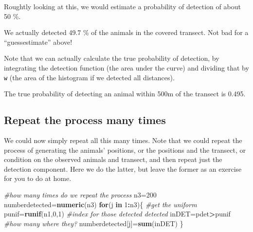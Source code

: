 \documentclass[
]{article}
\newenvironment{Shaded}{\begin{snugshade}}{\end{snugshade}}
\newcommand{\AttributeTok}[1]{\textcolor[rgb]{0.13,0.29,0.53}{#1}}
\newcommand{\CommentTok}[1]{\textcolor[rgb]{0.56,0.35,0.01}{\textit{#1}}}
\newcommand{\ControlFlowTok}[1]{\textcolor[rgb]{0.13,0.29,0.53}{\textbf{#1}}}
\newcommand{\DecValTok}[1]{\textcolor[rgb]{0.00,0.00,0.81}{#1}}
\newcommand{\FunctionTok}[1]{\textcolor[rgb]{0.13,0.29,0.53}{\textbf{#1}}}
\newcommand{\NormalTok}[1]{#1}
\newcommand{\OtherTok}[1]{\textcolor[rgb]{0.56,0.35,0.01}{#1}}
\newcommand{\SpecialCharTok}[1]{\textcolor[rgb]{0.81,0.36,0.00}{\textbf{#1}}}
\begin{document}
Roughtly looking at this, we would estimate a probability of detection
of about 50 \%.

We actually detected 49.7 \% of the animals in the covered transect. Not
bad for a ``guessestimate'' above!

Note that we can actually calculate the true probability of detection,
by integrating the detection function (the area under the curve) and
dividing that by \texttt{w} (the area of the histogram if we detected
all distances).

\begin{Shaded}
\end{Shaded}

The true probability of detecting an animal within 500m of the transect
is 0.495.

\subsection{Repeat the process many
times}\label{repeat-the-process-many-times}

We could now simply repeat all this many times. Note that we could
repeat the process of generating the animals' positions, or the
positions and the transect, or condition on the observed animals and
transect, and then repeat just the detection component. Here we do the
latter, but leave the former as an exercise for you to do at home.

\begin{Shaded}
\begin{Highlighting}[]
\CommentTok{\#how many times do we repeat the process}
\NormalTok{n3}\OtherTok{=}\DecValTok{200}
\NormalTok{numberdetected}\OtherTok{=}\FunctionTok{numeric}\NormalTok{(n3)}
\ControlFlowTok{for}\NormalTok{(j }\ControlFlowTok{in} \DecValTok{1}\SpecialCharTok{:}\NormalTok{n3)\{}
\CommentTok{\#get the uniform}
\NormalTok{punif}\OtherTok{=}\FunctionTok{runif}\NormalTok{(n1,}\DecValTok{0}\NormalTok{,}\DecValTok{1}\NormalTok{)}
\CommentTok{\#index for those detected detected}
\NormalTok{inDET}\OtherTok{=}\NormalTok{pdet}\SpecialCharTok{\textgreater{}}\NormalTok{punif}
\CommentTok{\#how many where they?}
\NormalTok{numberdetected[j]}\OtherTok{=}\FunctionTok{sum}\NormalTok{(inDET)}
\NormalTok{\}}
\end{Highlighting}
\end{Shaded}
\end{document}
